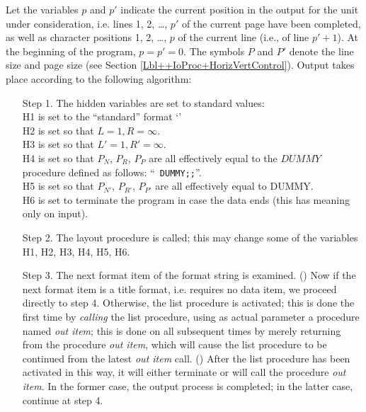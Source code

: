 \documentclass[a4paper,11pt]{article}
\begin{document}
Let the variables $p$ and $p'$ indicate the current position in the
output for the unit under consideration, i.e. lines 1, 2, \dots, $p'$
of the current page have been completed, as well as character
positions 1, 2, \dots, $p$ of the current line (i.e., of line $p'+1$).
At the beginning of the program, $p = p' = 0$. The symbols $P$ and
$P'$ denote the line size and page size (see Section
\ref{Lbl++IoProc+HorizVertControl}). Output takes place according to
the following algorithm:

\begin{enumerate}
  \item[Step 1.] The hidden variables are set to standard values:\\
    H1 is set to the ``standard'' format `'\\
    H2 is set so that $L = 1, R = \infty$.\\
    H3 is set so that $L' = 1, R' = \infty$.\\
    H4 is set so that $P_N$, $P_R$, $P_P$ are all effectively equal to
    the $DUMMY$ procedure defined as follows: ``{\tt {}
    DUMMY;;}''.\\
    H5 is set so that $P_{N'}$, $P_{R'}$, $P_{P'}$ are all effectively
    equal to DUMMY.\\
    H6 is set to terminate the program in case the data ends (this has
    meaning only on input).

    \item[Step 2.] The layout procedure is called; this may change
      some of the variables H1, H2, H3, H4, H5, H6.

    \item[Step 3.] The next format item of the format string is
      examined.  () Now if the next format item is a title format,
      i.e. requires no data item, we proceed directly to step 4.
      Otherwise, the list procedure is activated; this is done the
      first time by {\it calling} the list procedure, using as actual
      parameter a procedure named {\it out item}; this is done on all
      subsequent times by merely returning from the procedure {\it out
      item}, which will cause the list procedure to be continued from
      the latest {\it out item} call.  ()  After the list procedure has been
      activated in this way, it will either terminate or will call the
      procedure {\it out item}.  In the former case, the output
      process is completed; in the latter case, continue at step 4.


\end{enumerate}
\end{document}
